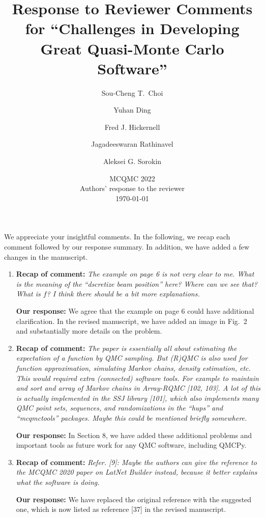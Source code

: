 \documentclass{article}[12pt]
\title{Response to Reviewer Comments for  ``Challenges in Developing Great Quasi-Monte Carlo Software''}
\author{Sou-Cheng T.~Choi \and Yuhan Ding \and Fred J. Hickernell \and Jagadeeswaran  Rathinavel \and Aleksei G. Sorokin}
\date{MCQMC 2022
   \\[1ex]  Authors' response to the reviewer
   \\[1ex] \today}
\begin{document}
\maketitle    

We appreciate your insightful comments.  In the following, we recap each comment followed by our response summary. In addition, we have added a few changes in the manuscript. 

\begin{enumerate}
    \item \textbf{Recap of comment:} \textit{The example on page 6 is not very clear to me. What is the meaning of the ``dscretize
beam position'' here? Where can we see that? What is $f$? I think there should be a
bit more explanations.}

\textbf{Our response:} We agree that the example on page 6 could have additional clarification. In the revised manuscript, we have added an image in Fig.~2 and  substantially more details on the problem. 

    \item \textbf{Recap of comment:} \textit{The paper is essentially all about estimating the expectation of a function by QMC sampling.
But (R)QMC is also used for function approximation, simulating Markov chains,
density estimation, etc. This would required extra (connected) software tools. For example
to maintain and sort and array of Markov chains in Array-RQMC [102, 103].
A lot of this is actually implemented in the SSJ library [101], which also implements
many QMC point sets, sequences, and randomizations in the “hups” and “mcqmctools”
packages. Maybe this could be mentioned briefly somewhere.}

\textbf{Our response:} In Section 8, we have added these additional problems and important tools as future work for any QMC software, including QMCPy.

    \item \textbf{Recap of comment:} \textit{Refer. [9]: Maybe the authors can give the reference to the MCQMC 2020 paper on
LatNet Builder instead, because it better explains what the software is doing.}
    
       \textbf{Our response:} We have replaced the original reference with the suggested one, which is now listed as reference [37] in the revised manuscript.
    

\end{enumerate}
\end{document}
